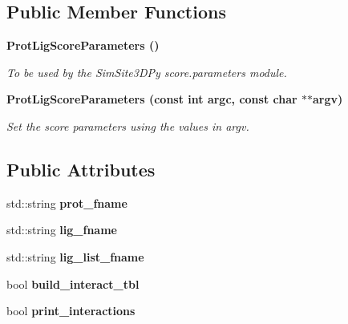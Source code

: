 \subsection*{Public Member Functions}
\begin{CompactItemize}
\item 
\bf{Prot\-Lig\-Score\-Parameters} ()\label{classSimSite3D_1_1ProtLigScoreParameters_1d7c25c9061b1997ec8774cab0fe6ce5}

\begin{CompactList}\small\item\em To be used by the SimSite3D\-Py score.parameters module. \item\end{CompactList}\item 
\bf{Prot\-Lig\-Score\-Parameters} (const int argc, const char $\ast$$\ast$argv)\label{classSimSite3D_1_1ProtLigScoreParameters_f8279eb37256fd5b6433900ac1ca8cab}

\begin{CompactList}\small\item\em Set the score parameters using the values in argv. \item\end{CompactList}\end{CompactItemize}
\subsection*{Public Attributes}
\begin{CompactItemize}
\item 
std::string \textbf{prot\_\-fname}\label{classSimSite3D_1_1ProtLigScoreParameters_d73e199c8788c4f367b7c0a246e00223}

\item 
std::string \textbf{lig\_\-fname}\label{classSimSite3D_1_1ProtLigScoreParameters_c6f884bad30d7e98f0fb5245dbd4d93e}

\item 
std::string \textbf{lig\_\-list\_\-fname}\label{classSimSite3D_1_1ProtLigScoreParameters_98f587548a6a1561b9291bfc778d5085}

\item 
bool \textbf{build\_\-interact\_\-tbl}\label{classSimSite3D_1_1ProtLigScoreParameters_20387a9ca9a836688d34d4e68c009632}

\item 
bool \textbf{print\_\-interactions}\label{classSimSite3D_1_1ProtLigScoreParameters_6d07515b95e1a858c129c8d2e6e1b5ea}

\end{CompactItemize}

